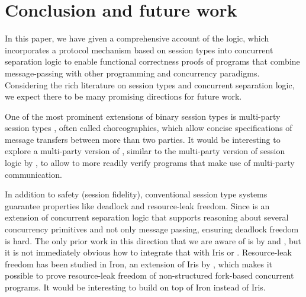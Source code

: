 \section{Conclusion and future work}

In this paper, we have given a comprehensive account of the \lname logic,
which incorporates a protocol mechanism based on session types into concurrent
separation logic to enable functional correctness proofs of programs that
combine message-passing with other programming and concurrency paradigms.
Considering the rich literature on session types and concurrent separation
logic, we expect there to be many promising directions for future work.

One of the most prominent extensions of binary session types is multi-party
session types \cite{honda-POPL2008}, often called choreographies, which
allow concise specifications of message transfers between more
than two parties.
It would be interesting to explore a multi-party version of \pname,
similar to the multi-party version of session logic by \citet{costea-APLAS2018},
to allow \lname to more readily verify programs that make use of multi-party communication.

In addition to safety (\ie session fidelity), conventional session type systems
guarantee properties like deadlock and resource-leak freedom.
Since \lname is an extension of concurrent separation logic that supports
reasoning about several concurrency primitives and not only message passing,
ensuring deadlock freedom is hard.
The only prior work in this direction that we are aware of is by
\citet{hamin-ECOOP2019} and \citet{cracium-ICECCS2015}, but it is not immediately obvious how to integrate that
with Iris or \lname.
Resource-leak freedom has been studied in Iron, an extension of Iris by
\citet{bizjak-PACMPL2019}, which makes it possible to prove resource-leak
freedom of non-structured fork-based concurrent programs.
It would be interesting to build \pname on top of Iron instead of Iris.
